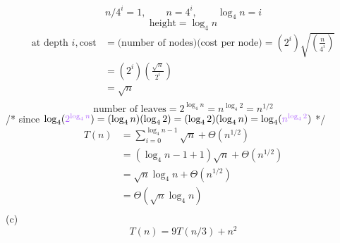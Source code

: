 \documentclass[12pt,border=4pt,multi]{article}%
\begin{document}
\[n / 4^i = 1, \qquad n = 4^i, \qquad \log_4 n = i\]
\[\text{height} = \log_4 n\]
\begin{align*}
\text{at depth } i , \text{cost} &= \text{(number of nodes)(cost per node)} = (2^i)\sqrt{\left(\frac{n}{4^i}\right)}\\
&= (2^i)\left(\frac{\sqrt{n}}{2^i}\right)\\
&= \sqrt{n}\\
\end{align*}
\[\text{number of leaves} = 2^{\log_4 n} = n^{\log_4 2} = n^{1 / 2}\]
/* since $\log_4(\textcolor{orchid}{2^{\log_4 n}}) = (\log_4 n)(\log_4 2) = (\log_4 2)(\log_4 n) = \log_4 (\textcolor{orchid}{n^{\log_4 2}})$ */
\begin{align*}
    T(n) &= \sum_{i = 0}^{\log_4 n - 1} \sqrt{n} + \Theta(n^{1/ 2})\\
    &= (\log_4 n - 1 + 1) \sqrt{n} + \Theta(n^{1/ 2})\\
    &= \sqrt{n}\log_4 n + \Theta(n^{1/ 2})\\
    &= \Theta(\sqrt{n}\log_4 n)\\
\end{align*}
\newpage
\noindent
(c)
\[T(n) = 9T(n/3) + n^2\]
\end{document}
